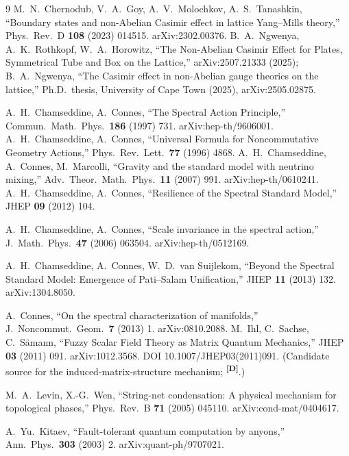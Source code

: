 \documentclass[12pt,a4paper,twoside]{article}
\theoremstyle{plain}
\theoremstyle{definition}
\theoremstyle{remark}
\newcommand{\catmark}[1]{\textsuperscript{\textsf{\textbf{[#1]}}}}
\begin{document}
\begin{thebibliography}{9}
M.~N.~Chernodub, V.~A.~Goy, A.~V.~Molochkov, A.~S.~Tanashkin, ``Boundary states and non-Abelian Casimir effect in lattice Yang--Mills theory,'' Phys.\ Rev.\ D \textbf{108} (2023) 014515. arXiv:2302.00376.
B.~A.~Ngwenya, A.~K.~Rothkopf, W.~A.~Horowitz, ``The Non-Abelian Casimir Effect for Plates, Symmetrical Tube and Box on the Lattice,'' arXiv:2507.21333 (2025); B.~A.~Ngwenya, ``The Casimir effect in non-Abelian gauge theories on the lattice,'' Ph.D.\ thesis, University of Cape Town (2025), arXiv:2505.02875.

A.~H.~Chamseddine, A.~Connes, ``The Spectral Action Principle,'' Commun.\ Math.\ Phys.\ \textbf{186} (1997) 731. arXiv:hep-th/9606001.
A.~H.~Chamseddine, A.~Connes, ``Universal Formula for Noncommutative Geometry Actions,'' Phys.\ Rev.\ Lett.\ \textbf{77} (1996) 4868.
A.~H.~Chamseddine, A.~Connes, M.~Marcolli, ``Gravity and the standard model with neutrino mixing,'' Adv.\ Theor.\ Math.\ Phys.\ \textbf{11} (2007) 991. arXiv:hep-th/0610241.
A.~H.~Chamseddine, A.~Connes, ``Resilience of the Spectral Standard Model,'' JHEP \textbf{09} (2012) 104.

A.~H.~Chamseddine, A.~Connes, ``Scale invariance in the spectral action,'' J.\ Math.\ Phys.\ \textbf{47} (2006) 063504. arXiv:hep-th/0512169.

A.~H.~Chamseddine, A.~Connes, W.~D.~van Suijlekom, ``Beyond the Spectral Standard Model: Emergence of Pati--Salam Unification,'' JHEP \textbf{11} (2013) 132. arXiv:1304.8050.

A.~Connes, ``On the spectral characterization of manifolds,'' J.\ Noncommut.\ Geom.\ \textbf{7} (2013) 1. arXiv:0810.2088.
M.~Ihl, C.~Sachse, C.~S\"amann, ``Fuzzy Scalar Field Theory as Matrix Quantum Mechanics,'' JHEP \textbf{03} (2011) 091. arXiv:1012.3568. DOI 10.1007/JHEP03(2011)091. (Candidate source for the induced-matrix-structure mechanism; \catmark{D}.)

M.~A.~Levin, X.-G.~Wen, ``String-net condensation: A physical mechanism for topological phases,'' Phys.\ Rev.\ B \textbf{71} (2005) 045110. arXiv:cond-mat/0404617.

A.~Yu.~Kitaev, ``Fault-tolerant quantum computation by anyons,'' Ann.\ Phys.\ \textbf{303} (2003) 2. arXiv:quant-ph/9707021.


\end{thebibliography}
\end{document}
